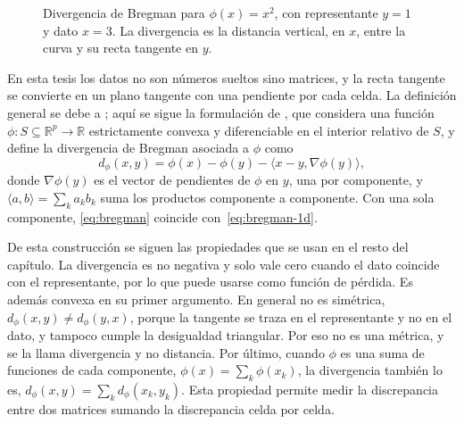 \begin{figure}[ht]
  \centering
  \caption{Divergencia de Bregman para $\phi(x) = x^2$, con representante
  $y = 1$ y dato $x = 3$. La divergencia es la distancia vertical, en $x$, entre
  la curva y su recta tangente en $y$.}
  \label{fig:bregman}
\end{figure}

En esta tesis los datos no son números sueltos sino matrices, y la recta
tangente se convierte en un plano tangente con una pendiente por cada celda. La
definición general se debe a \citet{Bregman1967}; aquí se sigue la formulación de
\citet{Banerjee2005}, que considera una función
$\phi : S \subseteq \mathbb{R}^p \to \mathbb{R}$ estrictamente convexa y
diferenciable en el interior relativo de $S$, y define la divergencia de Bregman
asociada a $\phi$ como
\begin{equation}\label{eq:bregman}
  d_\phi(x, y) = \phi(x) - \phi(y) - \langle x - y, \nabla\phi(y) \rangle ,
\end{equation}
donde $\nabla\phi(y)$ es el vector de pendientes de $\phi$ en $y$, una por
componente, y $\langle a, b \rangle = \sum_k a_k b_k$ suma los productos
componente a componente. Con una sola componente, \eqref{eq:bregman} coincide
con~\eqref{eq:bregman-1d}.

De esta construcción se siguen las propiedades que se usan en el resto del
capítulo. La divergencia es no negativa y solo vale cero cuando el dato coincide
con el representante, por lo que puede usarse como función de pérdida. Es además
convexa en su primer argumento. En general no es simétrica,
$d_\phi(x, y) \neq d_\phi(y, x)$, porque la tangente se traza en el
representante y no en el dato, y tampoco cumple la desigualdad triangular. Por
eso no es una métrica, y se la llama divergencia y no distancia. Por último,
cuando $\phi$ es una suma de funciones de cada componente,
$\phi(x) = \sum_k \phi(x_k)$, la divergencia también lo es,
$d_\phi(x, y) = \sum_k d_\phi(x_k, y_k)$. Esta propiedad permite medir la
discrepancia entre dos matrices sumando la discrepancia celda por celda.

